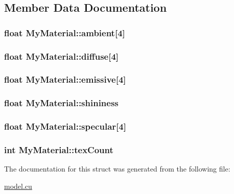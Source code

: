 \subsection{Member Data Documentation}
\hypertarget{structMyMaterial_ae313e57725574416d97b902bf908a6df}{
\subsubsection[{ambient}]{\setlength{\rightskip}{0pt plus 5cm}float My\-Material\-::ambient\mbox{[}4\mbox{]}}}\label{structMyMaterial_ae313e57725574416d97b902bf908a6df}
\hypertarget{structMyMaterial_ad0a8c69f12ec13fbc68bd983529cffbf}{
\subsubsection[{diffuse}]{\setlength{\rightskip}{0pt plus 5cm}float My\-Material\-::diffuse\mbox{[}4\mbox{]}}}\label{structMyMaterial_ad0a8c69f12ec13fbc68bd983529cffbf}
\hypertarget{structMyMaterial_aecb2b9b55df581dabddaed5d7fdcdf3c}{
\subsubsection[{emissive}]{\setlength{\rightskip}{0pt plus 5cm}float My\-Material\-::emissive\mbox{[}4\mbox{]}}}\label{structMyMaterial_aecb2b9b55df581dabddaed5d7fdcdf3c}
\hypertarget{structMyMaterial_a09fbe1259a7a3b62ced01a543e0a09b0}{
\subsubsection[{shininess}]{\setlength{\rightskip}{0pt plus 5cm}float My\-Material\-::shininess}}\label{structMyMaterial_a09fbe1259a7a3b62ced01a543e0a09b0}
\hypertarget{structMyMaterial_a58e5e9f9a5e025b3f768f6a95fc73b63}{
\subsubsection[{specular}]{\setlength{\rightskip}{0pt plus 5cm}float My\-Material\-::specular\mbox{[}4\mbox{]}}}\label{structMyMaterial_a58e5e9f9a5e025b3f768f6a95fc73b63}
\hypertarget{structMyMaterial_a6e14fca3bb658a2cf433b78b84985e68}{
\subsubsection[{tex\-Count}]{\setlength{\rightskip}{0pt plus 5cm}int My\-Material\-::tex\-Count}}\label{structMyMaterial_a6e14fca3bb658a2cf433b78b84985e68}


The documentation for this struct was generated from the following file\-:\begin{DoxyCompactItemize}
\item 
\hyperlink{model_8cu}{model.\-cu}\end{DoxyCompactItemize}
